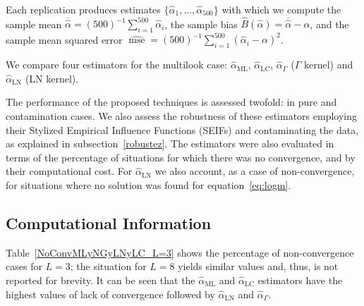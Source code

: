 \documentclass[twocolumn]{svjour3}
\begin{document}
Each replication produces estimates $\{\widehat{\alpha}_1, \dots, \widehat{\alpha}_{500}\}$ with which we compute 
the sample mean $\overline{\widehat{\alpha}}=(500)^{-1}{\sum_{i=1}^{500}{\widehat{\alpha}_i}}$, 
the sample bias $\widehat{B}(\widehat\alpha) = \overline{\widehat\alpha}- \alpha$, 
and 
the sample mean squared error $\widehat{\operatorname{mse}}=({500})^{-1}{\sum_{i=1}^{500}{(\widehat{\alpha}_i-\alpha)^2}}$.


We compare four estimators for the multilook case: 
$\widehat{\alpha}_{\text{{ML}}}$, 
$\widehat{\alpha}_{\text{{LC}}}$, 
$\widehat{\alpha}_{\Gamma}$ ($\Gamma$ kernel) and $\widehat{\alpha}_{\text{{LN}}}$ (LN kernel).

The performance of the proposed techniques is assessed twofold: in pure and contamination cases. 
We also assess the robustness of these estimators employing their Stylized Empirical Influence Functions (SEIFs) and contaminating the data, as explained in subsection~\ref{robustez}. 
The estimators were also evaluated in terms of the percentage of situations for which there was no convergence, and by their computational cost. 
For $\widehat{\alpha}_{\text{{LN}}}$ we also account, as a case of non-convergence, for situations where no solution was found for equation~\eqref{eq:logm}.


\subsection{Computational Information}

Table~\ref{NoConvMLyNGyLNyLC_L=3} shows the percentage of non-convergence cases for $L=3$; the situation for $L=8$ yields similar values and, thus, is not reported for brevity.
It can be seen that the $\widehat{\alpha}_{\text{{ML}}}$ and $\widehat{\alpha}_{\text{{LC}}}$ estimators have the highest values of lack of convergence followed by  $\widehat{\alpha}_{\text{{LN}}}$ and $\widehat{\alpha}_{\Gamma}$.
\end{document}

